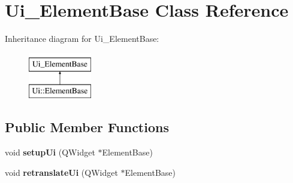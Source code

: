 \hypertarget{class_ui___element_base}{}\section{Ui\+\_\+\+Element\+Base Class Reference}
\label{class_ui___element_base}
Inheritance diagram for Ui\+\_\+\+Element\+Base\+:\begin{figure}[H]
\begin{center}
\leavevmode
\includegraphics[height=2.000000cm]{class_ui___element_base}
\end{center}
\end{figure}
\subsection*{Public Member Functions}
\begin{DoxyCompactItemize}
\item 
\mbox{\label{class_ui___element_base_a07b1613aa68af38f7a6c69c0cd4cee2f}} 
void {\bfseries setup\+Ui} (Q\+Widget $\ast$Element\+Base)
\item 
\mbox{\label{class_ui___element_base_a50d11388608f88af872775ce6626e69c}} 
void {\bfseries retranslate\+Ui} (Q\+Widget $\ast$Element\+Base)
\end{DoxyCompactItemize}
